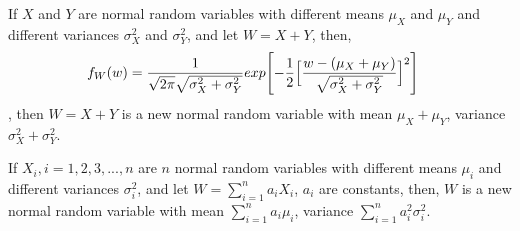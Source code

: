 \documentclass[
]{article}
\begin{document}
If \(X\) and \(Y\) are normal random variables with different means
\(\mu_X\) and \(\mu_Y\) and different variances \(\sigma_X^2\) and
\(\sigma_Y^2\), and let \(W=X+Y\), then, \[\begin{align}
f_W(w)&=\frac{1}{\sqrt{2\pi}\sqrt{\sigma_X^2+\sigma_Y^2}}exp\Biggl[-\frac{1}{2}\Bigl[\frac{w-(\mu_X+\mu_Y)}{\sqrt{\sigma_X^2+\sigma_Y^2}}\Bigr]^2\Biggr]
\end{align}\], then \(W=X+Y\) is a new normal random variable with mean
\(\mu_X+\mu_Y\), variance \(\sigma_X^2+\sigma_Y^2\).

If \(X_i, i=1,2,3,...,n\) are \(n\) normal random variables with
different means \(\mu_i\) and different variances \(\sigma_i^2\), and
let \(W=\sum_{i=1}^{n} a_iX_i\), \(a_i\) are constants, then, \(W\) is a
new normal random variable with mean \(\sum_{i=1}^{n}a_i\mu_i\),
variance \(\sum_{i=1}^{n}a_i^2\sigma_i^2\).
\end{document}
